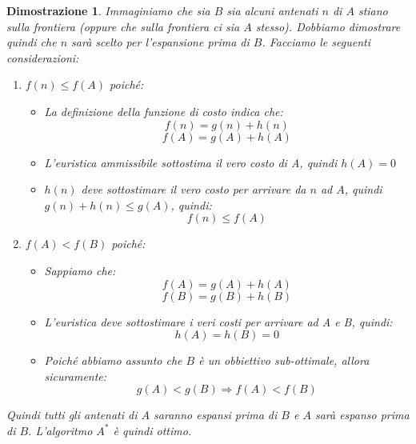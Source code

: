 \documentclass[12pt]{article}
\newtheorem{Dimostrazione}{Dimostrazione}[subsection]
\begin{document}
\begin{Dimostrazione}
    Immaginiamo che sia $B$ sia alcuni antenati $n$ di $A$ stiano sulla frontiera (oppure che sulla frontiera ci sia $A$ stesso).
    Dobbiamo dimostrare quindi che $n$ sarà scelto per l'espansione prima di $B$.
    Facciamo le seguenti considerazioni:
    \begin{enumerate}
        \item $f(n) \leq f(A)$ poiché:
        \begin{itemize}
            \item La definizione della funzione di costo indica che:
            $$f(n) = g(n) + h(n)$$
            $$f(A) = g(A) + h(A)$$
            \item L'euristica ammissibile sottostima il vero costo di A, quindi $h(A) = 0$
            \item $h(n)$ deve sottostimare il vero costo per arrivare da $n$ ad $A$, quindi $g(n) + h(n) \leq g(A)$,
            quindi:
            $$f(n) \leq f(A)$$
        \end{itemize}
        \item $f(A) < f(B)$ poiché:
        \begin{itemize}
            \item Sappiamo che:
            $$f(A) = g(A) + h(A)$$
            $$f(B) = g(B) + h(B)$$
            \item L'euristica deve sottostimare i veri costi per arrivare ad A e B, quindi:
            $$h(A) = h(B) = 0$$
            \item Poiché abbiamo assunto che $B$ è un obbiettivo sub-ottimale, allora sicuramente:
            $$g(A) < g(B) \Rightarrow f(A) < f(B)$$
        \end{itemize}
    \end{enumerate}
    Quindi tutti gli antenati di $A$ saranno espansi prima di $B$ e $A$ sarà espanso prima di $B$.
    L'algoritmo $A^*$ è quindi ottimo.
\end{Dimostrazione}
\end{document}

